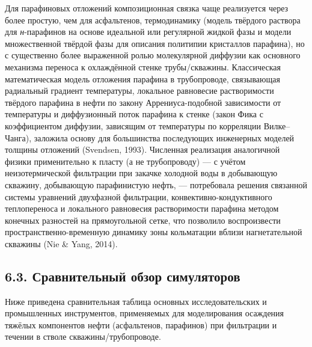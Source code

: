 \documentclass[11pt]{extarticle}
\begin{document}
Для парафиновых отложений композиционная связка чаще реализуется через более простую, чем для асфальтенов, термодинамику (модель твёрдого раствора для \emph{н}-парафинов на основе идеальной или регулярной жидкой фазы и модели множественной твёрдой фазы для описания политипии кристаллов парафина), но с существенно более выраженной ролью молекулярной диффузии как основного механизма переноса к охлаждённой стенке трубы/скважины. Классическая математическая модель отложения парафина в трубопроводе, связывающая радиальный градиент температуры, локальное равновесие растворимости твёрдого парафина в нефти по закону Аррениуса-подобной зависимости от температуры и диффузионный поток парафина к стенке (закон Фика с коэффициентом диффузии, зависящим от температуры по корреляции Вилке--Чанга), заложила основу для большинства последующих инженерных моделей толщины отложений (Svendsen, 1993). Численная реализация аналогичной физики применительно к пласту (а не трубопроводу) --- с учётом неизотермической фильтрации при закачке холодной воды в добывающую скважину, добывающую парафинистую нефть, --- потребовала решения связанной системы уравнений двухфазной фильтрации, конвективно-кондуктивного теплопереноса и локального равновесия растворимости парафина методом конечных разностей на прямоугольной сетке, что позволило воспроизвести пространственно-временную динамику зоны кольматации вблизи нагнетательной скважины (Nie \& Yang, 2014).

\subsection{6.3. Сравнительный обзор симуляторов}\label{ux441ux440ux430ux432ux43dux438ux442ux435ux43bux44cux43dux44bux439-ux43eux431ux437ux43eux440-ux441ux438ux43cux443ux43bux44fux442ux43eux440ux43eux432}

Ниже приведена сравнительная таблица основных исследовательских и промышленных инструментов, применяемых для моделирования осаждения тяжёлых компонентов нефти (асфальтенов, парафинов) при фильтрации и течении в стволе скважины/трубопроводе.
\end{document}
